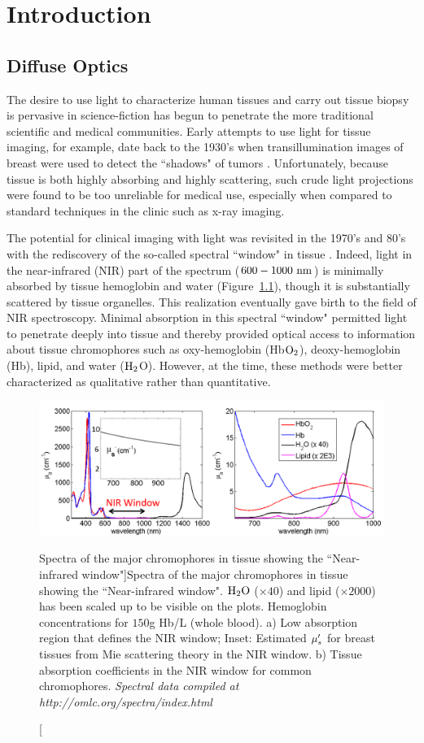 \chapter{Introduction}
\section{Diffuse Optics}
The desire to use light to characterize human tissues and carry out tissue biopsy is pervasive in science-fiction has begun to penetrate the more traditional scientific and medical communities.  Early attempts to use light for tissue imaging, for example, date back to the 1930's when transillumination images of breast were used to detect the ``shadows" of tumors \cite{Cutler1931}. Unfortunately, because tissue is both highly absorbing and highly scattering, such crude light projections were found to be too unreliable for medical use, especially when compared to standard techniques in the clinic such as x-ray imaging. 

The potential for clinical imaging with light was revisited in the 1970's and 80's with the rediscovery of the so-called spectral ``window" in tissue \cite{Jobsis1977,Jo1999,Jo1999a}.  Indeed, light in the near-infrared (NIR) part of the spectrum ($600-1000~\rm{nm}$) is minimally absorbed by tissue hemoglobin and water (Figure~\ref{fig:NIRwin}), though it is substantially scattered by tissue organelles. This realization eventually gave birth to the field of NIR spectroscopy. Minimal absorption in this spectral ``window" permitted light to penetrate deeply into tissue and thereby provided optical access to information about tissue chromophores such as oxy-hemoglobin (Hb$\rm{O_2}$), deoxy-hemoglobin (Hb), lipid, and water ($\rm{H_2}$O). However, at the time, these methods were better characterized as qualitative rather than quantitative.
%
\begin{figure}[t]
\centering
\includegraphics[width=14.5cm]{./figures/1_Introduction/NIRwin.png}
\caption[Spectra of the major chromophores in tissue showing the ``Near-infrared window"]{Spectra of the major chromophores in tissue showing the ``Near-infrared window". $\rm{H_2O}$ ($\times 40$) and lipid ($\times 2000$) has been scaled up to be visible on the plots. Hemoglobin concentrations for $150$g Hb/L (whole blood). a) Low absorption region that defines the NIR window; Inset: Estimated $\mu_s^{\prime}$ for breast tissues from Mie scattering theory in the NIR window. b) Tissue absorption coefficients in the NIR window for common chromophores. \textit{Spectral data compiled at http://omlc.org/spectra/index.html}}
\label{fig:NIRwin}
\end{figure}

